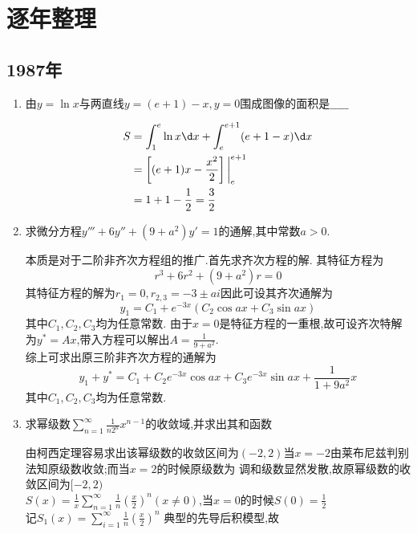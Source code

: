\documentclass[12pt, a4paper, oneside, UTF8]{ctexbook}
\begin{document}
\newpage

\section{逐年整理}
\subsection{1987年}
\begin{enumerate}
    \item 由$y=\ln{x}$与两直线$y=(e+1)-x,y=0$围成图像的面积是$\_\_\_\_\_$ 

    \begin{solution}
    \begin{align*}
        S &= \int_{1}^{e}\ln{x}\d x + \int_{e}^{e+1}(e+1-x)\d x \\
        &=\left[(e+1)x-\frac{x^2}{2}\right]\bigg|_{e}^{e+1} \\
        &=1+1-\frac{1}{2}=\frac{3}{2}
    \end{align*}
    \end{solution}
    \item \bl[2] 求微分方程$y'''+6y''+(9+a^2)y'=1$的通解,其中常数$a>0$. 
    \begin{solution}
        本质是对于二阶非齐次方程组的推广.首先求齐次方程的解. 其特征方程为
        $$
        r^3 + 6r^2 + (9+a^2)r = 0
        $$
        其特征方程的解为$r_1=0,r_{2,3}=-3\pm ai$因此可设其齐次通解为
        $$
        y_1=C_1+e^{-3x}\left(C_2\cos{ax}+C_3\sin{ax}\right)
        $$ 
        其中$C_1,C_2,C_3$均为任意常数.
        由于$x=0$是特征方程的一重根,故可设齐次特解为$y^*=Ax$,带入方程可以解出$A=\frac{1}{9+a^2}$.\\
        综上可求出原三阶非齐次方程的通解为
        $$
        y_1+y^*=C_1+C_2e^{-3x}\cos{ax}+C_3e^{-3x}\sin{ax}+\frac{1}{1+9a^2}x 
        $$
        其中$C_1,C_2,C_3$均为任意常数.
    \end{solution}
    \item 求幂级数$\sum_{n=1}^{\infty}\frac{1}{n2^n}x^{n-1}$的收敛域,并求出其和函数 
    \begin{solution}
        由柯西定理容易求出该幂级数的收敛区间为$(-2,2)$当$x=-2$由莱布尼兹判别法知原级数收敛;而当$x=2$的时候原级数为
        调和级数显然发散,故原幂级数的收敛区间为$[-2,2)$ \\
        $S(x)=\frac{1}{x}\sum_{n=1}^{\infty}\frac{1}{n}(\frac{x}{2})^n(x\neq 0)$,当$x=0$的时候$S(0)=\frac{1}{2}$ \\
        记$S_1(x)=\sum_{i=1}^{\infty}\frac{1}{n}\left(\frac{x}{2}\right)^n$ 典型的先导后积模型,故 \\

\end{solution}
\end{enumerate}
\end{document}
